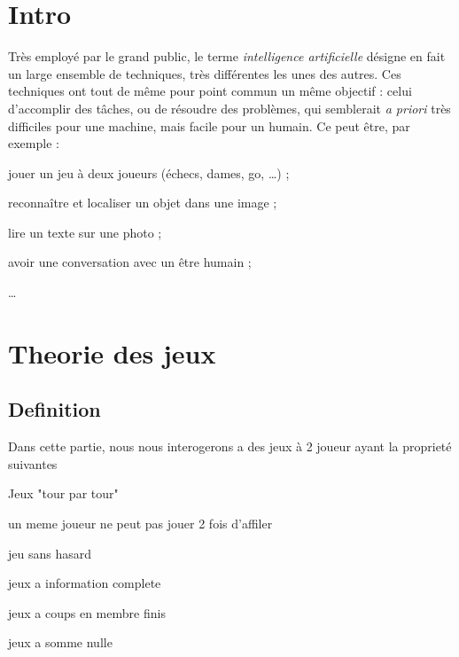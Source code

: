\documentclass[a4paper,french,bookmarks]{article}
\begin{document}
    \renewcommand{\thesection}{\Roman{section}} 
    \renewcommand{\thesubsection}{\thesection.\Alph{subsection}}
    \renewcommand{\labelenumi}{\thesection.\arabic{enumi}.}
    \renewcommand*{\labelenumii}{\alph{enumii}.}
    \renewcommand*{\labelenumiii}{\alph{enumiii}.}
    
    \def\authorvar{DRISSI Rayan}
    \section{Intro}
    
    
    Très employé par le grand public, le terme \emph{intelligence artificielle} désigne en fait un large ensemble de techniques, très différentes les unes des autres. Ces techniques ont tout de même pour point commun un même objectif : celui d'accomplir des tâches, ou de résoudre des problèmes, qui semblerait \emph{a priori} très difficiles pour une machine, mais facile pour un humain. Ce peut être, par exemple :

    \begin{enumerate}
        \itt jouer un jeu à deux joueurs (échecs, dames, go, \dots) ;
        
        \itt reconnaître et localiser un objet dans une image ;
        
        \itt lire un texte sur une photo ;
        
        \itt avoir une conversation avec un être humain ;
        
        \itt \dots
    \end{enumerate}
    
    
    \section{Theorie des jeux}
    
    \subsection{Definition}
    
    Dans cette partie, nous nous interogerons a des jeux à 2 joueur ayant la proprieté suivantes
    
    \begin{enumerate}
        
        \itt Jeux "tour par tour"
        
        \itt un meme joueur ne peut pas jouer 2 fois d'affiler 
        
        \itt jeu sans hasard
        
        \itt jeux a information complete
        
        \itt jeux a coups en membre finis
        
        \itt jeux a somme nulle  
        
    \end{enumerate}
    
\end{document}
